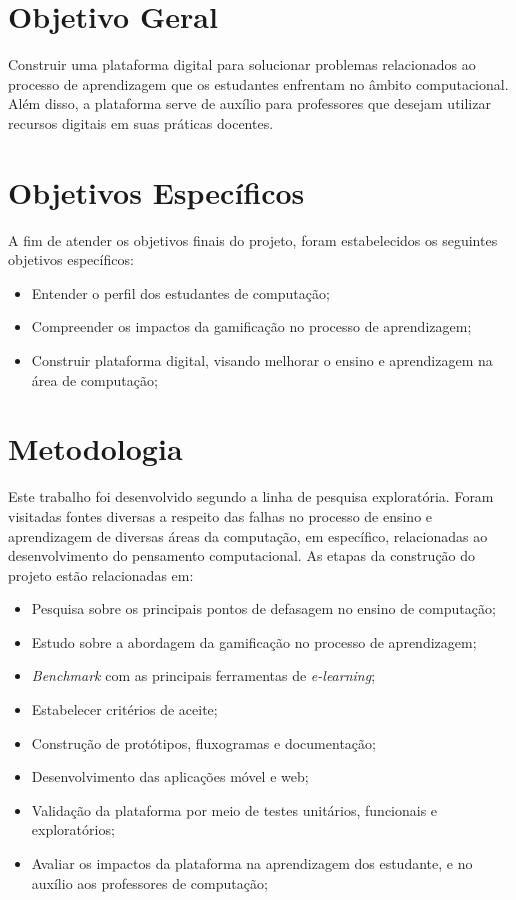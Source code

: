 \section{Objetivo Geral}
Construir uma plataforma digital para solucionar problemas relacionados ao processo de aprendizagem que os estudantes enfrentam no âmbito computacional. Além disso, a plataforma serve de auxílio para professores que desejam utilizar recursos digitais em suas práticas docentes.

\section{Objetivos Específicos}

A fim de atender os objetivos finais do projeto, foram estabelecidos os seguintes objetivos específicos:

\begin{itemize}
  \item Entender o perfil dos estudantes de computação;
  \item Compreender os impactos da gamificação no processo de aprendizagem;
  \item Construir plataforma digital, visando melhorar o ensino e aprendizagem na área de computação;
\end{itemize}

\section{Metodologia}
Este trabalho foi desenvolvido segundo a linha de pesquisa exploratória. Foram visitadas fontes diversas a respeito das falhas no processo de ensino e aprendizagem de diversas áreas da computação, em específico, relacionadas ao desenvolvimento do pensamento computacional. As etapas da construção do projeto estão relacionadas em:

\begin{itemize}
  \item Pesquisa sobre os principais pontos de defasagem no ensino de computação;
  \item Estudo sobre a abordagem da gamificação no processo de aprendizagem;
  \item \textit{Benchmark} com as principais ferramentas de \textit{e-learning};
  \item Estabelecer critérios de aceite;
  \item Construção de protótipos, fluxogramas e documentação;
  \item Desenvolvimento das aplicações móvel e web;
  \item Validação da plataforma por meio de testes unitários, funcionais e exploratórios;
  \item Avaliar os impactos da plataforma na aprendizagem dos estudante, e no auxílio aos professores de computação;
\end{itemize}

